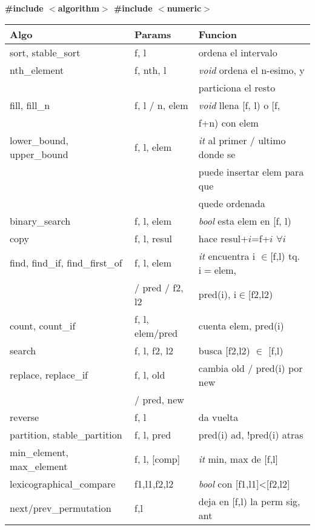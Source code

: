 \textbf{\#include $<$algorithm$>$ \#include $<$numeric$>$ \\}
\begin{tabular}{|l|l|p{5.4cm}|} \hline
\textbf{Algo} & \textbf{Params} &  \textbf{Funcion} \\  \hline
sort, stable\_sort & f, l &  ordena el intervalo \\  \hline
nth\_element & f, nth, l & \textit{void} ordena el n-esimo, y \\ && particiona el resto \\  \hline
fill, fill\_n & f, l / n, elem & \textit{void} llena [f, l) o [f, \\ && f+n) con elem \\  \hline
lower\_bound, upper\_bound & f, l, elem & \textit{it} al primer / ultimo donde se \\ && puede insertar elem para que\\ && quede ordenada \\  \hline
binary\_search & f, l, elem & \textit{bool} esta elem en [f, l) \\  \hline
copy & f, l, resul & hace resul+$i$=f+$i$ $\forall i$ \\  \hline
find, find\_if, find\_first\_of & f, l, elem & \textit{it} encuentra i $\in$[f,l) tq. i$=$elem, \\ & / pred / f2, l2 & pred(i), i$\in$[f2,l2)\\\hline
count, count\_if & f, l, elem/pred & cuenta elem, pred(i)\\\hline
search & f, l, f2, l2 & busca [f2,l2) $\in$ [f,l)\\\hline
replace, replace\_if & f, l, old & cambia old / pred(i) por new \\ & / pred, new &\\\hline
reverse & f, l & da vuelta\\\hline
partition, stable\_partition & f, l, pred & pred(i) ad, !pred(i) atras\\\hline
min\_element, max\_element & f, l, [comp] & \textit{it} min, max de [f,l]\\\hline
lexicographical\_compare & f1,l1,f2,l2 & \textit{bool} con [f1,l1]<[f2,l2]\\\hline
next/prev\_permutation & f,l & deja en [f,l) la perm sig, ant\\\hline

\end{tabular}
